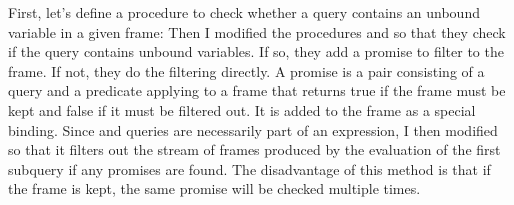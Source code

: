 \begin{exe}[4.77]
    First, let’s define a procedure to check whether a query contains an unbound 
    variable in a given frame:
    Then I modified the procedures  and  so that 
    they check if the query contains unbound variables. If so, they add 
    a promise to filter to the frame. If not, they do the filtering directly. 
    A promise is a pair consisting of a query and a predicate applying to 
    a frame that returns true if the frame must be kept and false if it must be 
    filtered out. It is added to the frame as a special binding. Since 
     and  queries are necessarily part of an 
     expression, I then modified  so that it filters out 
    the stream of frames produced by the evaluation of the first subquery if any 
    promises are found. The disadvantage of this method is that if the frame is 
    kept, the same promise will be checked multiple times.
\end{exe}

